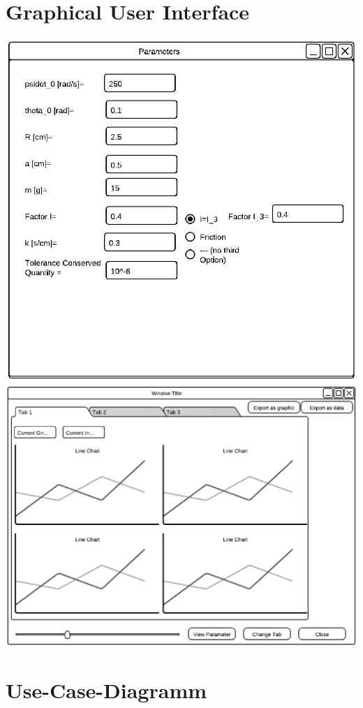 \section{Graphical User Interface}
\label{sec:3.3}
\includegraphics[width=6in,keepaspectratio=true]{figures/GUIParameterInputForm.eps}
\includegraphics[width=6in,keepaspectratio=true]{figures/GUIDisplayForm.eps}
\section{Use-Case-Diagramm}
\label{sec:3.4}


